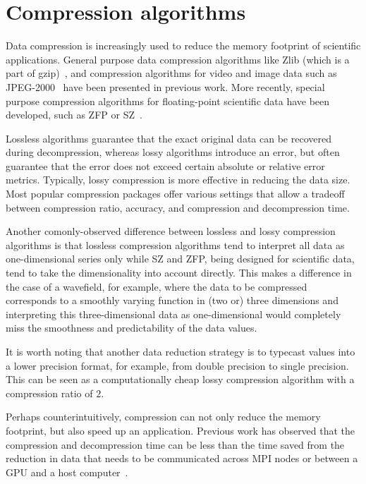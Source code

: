 \section{Compression algorithms}



Data compression is increasingly used to reduce the memory footprint of
scientific applications. General purpose data compression algorithms like Zlib
(which is a part of gzip)~\cite{deutsch1996zlib}, and compression algorithms for
video and image data such as JPEG-2000~\cite{skodras2001jpeg} have been
presented in previous work. More recently, special purpose compression
algorithms for floating-point scientific data have been developed, such as ZFP
or SZ~\cite{lindstrom2014fixed,di2018efficient}.

Lossless algorithms guarantee that the exact original data can be recovered
during decompression, whereas lossy algorithms introduce an error, but often
guarantee that the error does not exceed certain absolute or relative error
metrics. Typically, lossy compression is more effective in reducing the data
size. Most popular compression packages offer various settings that allow a
tradeoff between compression ratio, accuracy, and compression and decompression
time.

Another comonly-observed difference between lossless and lossy
compression algorithms is that lossless compression algorithms tend to
interpret all data as one-dimensional series only while SZ and ZFP,
being designed for scientific data, tend to take the dimensionality
into account directly. This makes a difference in the case of a
wavefield, for example, where the data to be compressed corresponds to
a smoothly varying function in (two or) three dimensions and
interpreting this three-dimensional data as one-dimensional would
completely miss the smoothness and predictability of the data values.

It is worth noting that another data reduction strategy is to typecast values
into a lower precision format, for example, from double precision to single
precision. This can be seen as a computationally cheap lossy compression
algorithm with a compression ratio of $2$.

Perhaps counterintuitively, compression can not only reduce the memory
footprint, but also speed up an application. Previous work has observed that the
compression and decompression time can be less than the time saved from the
reduction in data that needs to be communicated across MPI nodes or between a
GPU and a host computer~\cite{gpu-compression}.

